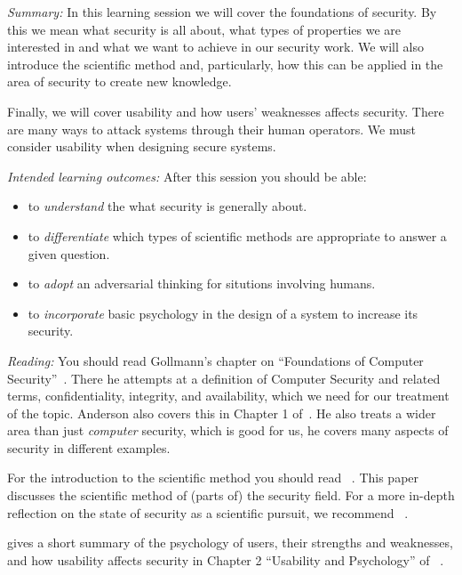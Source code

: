 \mode*


\emph{Summary:}
In this learning session we will cover the foundations of security.
By this we mean what security is all about, \eg what types of properties we are 
interested in and what we want to achieve in our security work.
We will also introduce the scientific method and, particularly, how this can be 
applied in the area of security to create new knowledge.

Finally, we will cover usability and how users' weaknesses affects security.
There are many ways to attack systems through their human operators.
We must consider usability when designing secure systems.

\emph{Intended learning outcomes:}
After this session you should be able:
\begin{itemize}
  \item to \emph{understand} the what security is generally about.
  \item to \emph{differentiate} which types of scientific methods are 
    appropriate to answer a given question.
  \item to \emph{adopt} an adversarial thinking for situtions involving humans.
  \item to \emph{incorporate} basic psychology in the design of a system to 
    increase its security.
\end{itemize}


\emph{Reading:}
You should read Gollmann's chapter on \enquote{Foundations of Computer 
  Security}~\cite[Chap.\ 3]{Gollmann2011cs}.
There he attempts at a definition of Computer Security and related terms, \eg 
confidentiality, integrity, and availability, which we need for our treatment of 
the topic.
Anderson also covers this in Chapter 1 of~\cite{Anderson2008sea}.
He also treats a wider area than just \emph{computer} security, which is good 
for us, he covers many aspects of security in different examples.

For the introduction to the scientific method you should read 
~\cite{HowToDesignSecurityExperiments}.
This paper discusses the scientific method of (parts of) the security field.
For a more in-depth reflection on the state of security as a scientific pursuit, 
we recommend
~\cite{SecurityAsAScience}.

 gives a short summary of the psychology of users, 
their strengths and weaknesses, and how usability affects security in Chapter 2 
\enquote{Usability and Psychology} of 
~\cite{Anderson2008sea}.
